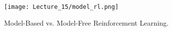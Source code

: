 \documentclass[11pt]{article}
\begin{document}
\begin{figure}[!ht]
\centering
\texttt{[image: Lecture\_15/model\_rl.png]}
\caption{Model-Based vs. Model-Free Reinforcement Learning.}
\end{figure}

\vspace*{\fill}
{


}


\end{document}
